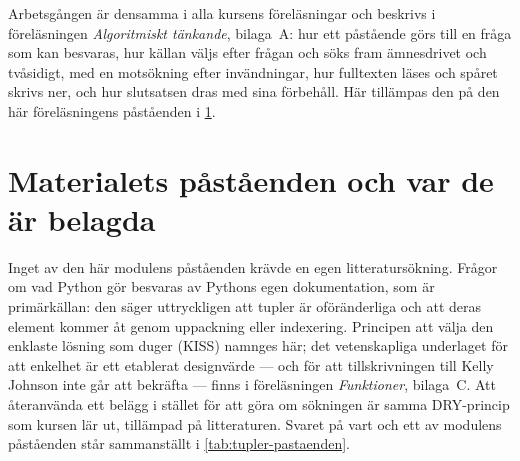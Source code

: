 Arbetsgången är densamma i alla kursens föreläsningar och beskrivs i
föreläsningen \emph{Algoritmiskt tänkande}, bilaga~A: hur ett påstående
görs till en fråga som kan besvaras, hur källan väljs efter frågan och
söks fram ämnesdrivet och tvåsidigt, med en motsökning efter
invändningar, hur fulltexten läses och spåret skrivs ner, och hur
slutsatsen dras med sina förbehåll.  Här tillämpas den på den här
föreläsningens påståenden i \cref{sec:tupler-pastaenden}.

\section{Materialets påståenden och var de är belagda}
\label{sec:tupler-pastaenden}

Inget av den här modulens påståenden krävde en egen litteratursökning.
Frågor om vad Python gör besvaras av Pythons egen
dokumentation\autocite{PythonDataStructures}, som är primärkällan: den
säger uttryckligen att tupler är oföränderliga och att deras element
kommer åt genom uppackning eller indexering.  Principen att välja den
enklaste lösning som duger (\foreignlanguage{english}{KISS}) namnges
här; det vetenskapliga underlaget för att enkelhet är ett etablerat
designvärde --- och för att tillskrivningen till Kelly Johnson inte går
att bekräfta --- finns i föreläsningen \emph{Funktioner}, bilaga~C.
Att återanvända ett belägg i
stället för att göra om sökningen är samma DRY-princip som kursen lär ut,
tillämpad på litteraturen.  Svaret på vart och ett av modulens påståenden
står sammanställt i \cref{tab:tupler-pastaenden}.

